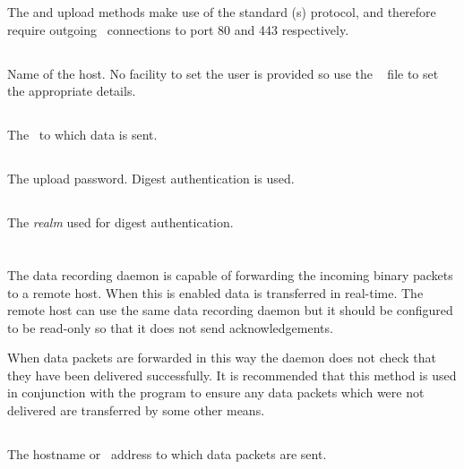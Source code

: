 The  and  upload methods make use of the standard
\http(s) protocol, and therefore require outgoing \tcp\ connections to
port 80 and 443 respectively. 

\subsection{}
Name of the  host. No facility to set the user is
provided so use the \ssh\  file to set the
appropriate details.


\subsection{}
The \URL\ to which data is sent.

\subsection{}
The upload password. Digest authentication is used.

\subsection{}
The \emph{realm} used for digest authentication.

\section{}

The data recording daemon is capable of forwarding the incoming binary
packets to a remote host. When this is enabled data is transferred in
real-time. The remote host can use the same data recording daemon but
it should be configured to be read-only so that it does not send
acknowledgements.

When data packets are forwarded in this way the daemon does not check
that they have been delivered successfully. It is recommended that
this method is used in conjunction with the 
program to ensure any data packets which were not delivered are
transferred by some other means.

\subsection{}
The hostname or \ip\ address to which data packets are sent.

